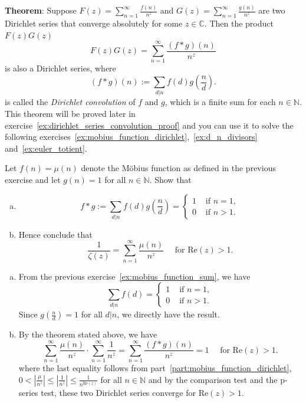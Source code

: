 \documentclass{elegantbook}
\begin{document}
\begin{problemset}[Exercises]
  \textbf{Theorem}: Suppose $F(z) = \sum_{n=1}^{\infty} \frac{f(n)}{n^z}$ and $G(z) = \sum_{n=1}^{\infty} \frac{g(n)}{n^z}$ are two Dirichlet series that converge absolutely for some $z \in \mathbb{C}$. Then the product $F(z)G(z)$
  \[
    F(z)G(z) = \sum_{n=1}^{\infty} \frac{(f * g)(n)}{n^z}
  \]
  is also a Dirichlet series, where
  \[
    (f * g)(n) := \sum_{d|n} f(d) g\left(\frac{n}{d}\right).
  \]
  is called the \textit{Dirichlet convolution} of $f$ and $g$, which is a finite sum for each $n \in \mathbb{N}$. \\
  This theorem will be proved later in exercise~\ref{ex:dirichlet_series_convolution_proof} and you can use it to solve the following exercises~\ref{ex:mobius_function_dirichlet},~\ref{ex:d_n_divisors} and~\ref{ex:euler_totient}.
  \vspace{30pt}
  \item \label{ex:mobius_function_dirichlet} Let $f(n)=\mu(n)$ denote the Möbius function as defined in the previous exercise and let $g(n)=1$ for all $n \in \mathbb{N}$. Show that
  \begin{enumerate}[(a)]
    \item \label{part:mobius_function_dirichlet} \[
            f * g := \sum_{d|n} f(d) g\left(\frac{n}{d}\right) = \begin{cases}
              1 & \text{ if } n=1, \\
              0 & \text{ if } n>1.
            \end{cases}
          \]
    \item Hence conclude that
    \[
      \frac{1}{\zeta(z)} = \sum_{n=1}^{\infty} \frac{\mu(n)}{n^z} \quad \text{ for } \mathrm{Re}(z)>1.
    \]
  \end{enumerate}
  \begin{solution}
    \begin{enumerate}[(a)]
      \item From the previous exercise~\ref{ex:mobius_function_sum}, we have
      \[
        \sum_{d|n} f(d) = \begin{cases}
          1 & \text{ if } n=1, \\
          0 & \text{ if } n>1.
        \end{cases}
      \]
      Since $g\left(\frac{n}{d}\right) = 1$ for all $d|n$, we directly have the result.
      \item By the theorem stated above, we have
      \[
        \sum_{n=1}^{\infty} \frac{\mu(n)}{n^z} \cdot \sum_{n=1}^{\infty} \frac{1}{n^z} = \sum_{n=1}^{\infty} \frac{(f * g)(n)}{n^z} = 1 \quad \text{ for } \mathrm{Re}(z)>1.
      \]
      where the last equality follows from part~\ref{part:mobius_function_dirichlet}, $0<|\frac{\mu}{n^z}| \leq |\frac{1}{n^z}| \leq \frac{1}{n^{\mathrm{Re}(z)}}$ for all $n \in \mathbb{N}$ and by the comparison test and the p-series test, these two Dirichlet series converge for $\mathrm{Re}(z)>1$.


\end{enumerate}
\end{solution}
\end{problemset}
\end{document}
